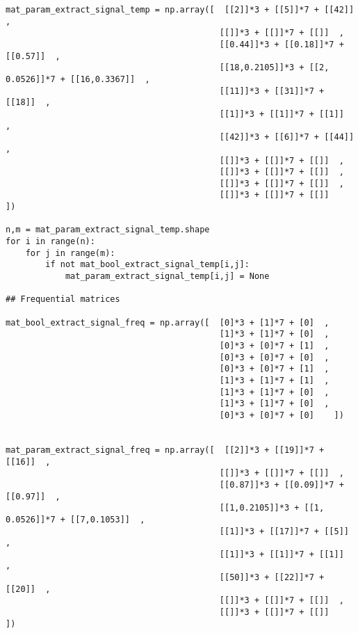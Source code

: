 \documentclass{article}
\begin{document}
\begin{lstlisting}
 

                                           
mat_param_extract_signal_temp = np.array([  [[2]]*3 + [[5]]*7 + [[42]]  ,
                                           [[]]*3 + [[]]*7 + [[]]  ,
                                           [[0.44]]*3 + [[0.18]]*7 + [[0.57]]  ,
                                           [[18,0.2105]]*3 + [[2, 0.0526]]*7 + [[16,0.3367]]  ,
                                           [[11]]*3 + [[31]]*7 + [[18]]  ,
                                           [[1]]*3 + [[1]]*7 + [[1]]  ,
                                           [[42]]*3 + [[6]]*7 + [[44]]  ,
                                           [[]]*3 + [[]]*7 + [[]]  ,
                                           [[]]*3 + [[]]*7 + [[]]  ,
                                           [[]]*3 + [[]]*7 + [[]]  ,
                                           [[]]*3 + [[]]*7 + [[]]    ])

n,m = mat_param_extract_signal_temp.shape
for i in range(n):
    for j in range(m):
        if not mat_bool_extract_signal_temp[i,j]:
            mat_param_extract_signal_temp[i,j] = None

## Frequential matrices

mat_bool_extract_signal_freq = np.array([  [0]*3 + [1]*7 + [0]  ,
                                           [1]*3 + [1]*7 + [0]  ,
                                           [0]*3 + [0]*7 + [1]  ,
                                           [0]*3 + [0]*7 + [0]  ,
                                           [0]*3 + [0]*7 + [1]  ,
                                           [1]*3 + [1]*7 + [1]  ,
                                           [1]*3 + [1]*7 + [0]  ,
                                           [1]*3 + [1]*7 + [0]  ,
                                           [0]*3 + [0]*7 + [0]    ])

                                    
mat_param_extract_signal_freq = np.array([  [[2]]*3 + [[19]]*7 + [[16]]  ,
                                           [[]]*3 + [[]]*7 + [[]]  ,
                                           [[0.87]]*3 + [[0.09]]*7 + [[0.97]]  ,
                                           [[1,0.2105]]*3 + [[1, 0.0526]]*7 + [[7,0.1053]]  ,
                                           [[1]]*3 + [[17]]*7 + [[5]]  ,
                                           [[1]]*3 + [[1]]*7 + [[1]]  ,
                                           [[50]]*3 + [[22]]*7 + [[20]]  ,
                                           [[]]*3 + [[]]*7 + [[]]  ,
                                           [[]]*3 + [[]]*7 + [[]]    ])


\end{lstlisting}
\end{document}
